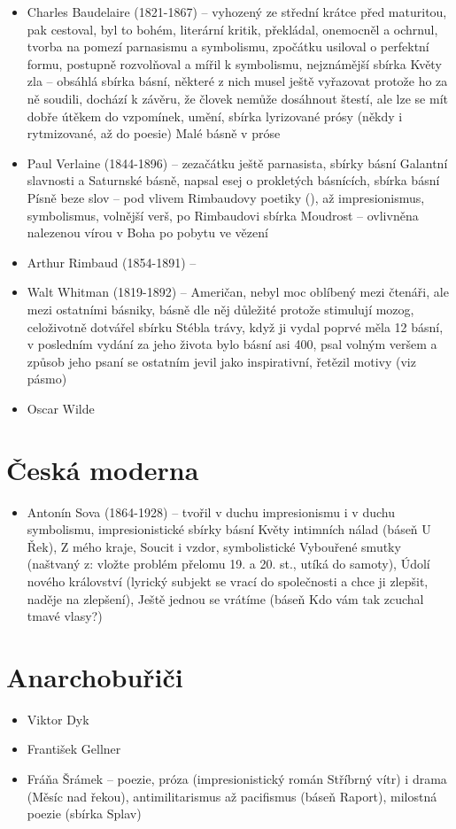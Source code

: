 \documentclass{article}
\begin{document}
\begin{itemize}
  \begin{itemize}
    \item Charles Baudelaire (1821-1867) -- vyhozený ze střední krátce před maturitou, pak cestoval, byl to bohém, literární kritik, překládal, onemocněl a ochrnul, tvorba na pomezí parnasismu a symbolismu, zpočátku usiloval o perfektní formu, postupně rozvolňoval a mířil k symbolismu, nejznámější sbírka Květy zla -- obsáhlá sbírka básní, některé z nich musel ještě vyřazovat protože ho za ně soudili, dochází k závěru, že človek nemůže dosáhnout štestí, ale lze se mít dobře útěkem do vzpomínek, umění, sbírka lyrizované prósy (někdy i rytmizované, až do poesie) Malé básně v próse
    \item Paul Verlaine (1844-1896) -- zezačátku ještě parnasista, sbírky básní Galantní slavnosti a Saturnské básně, napsal esej o prokletých básnících, sbírka básní Písně beze slov -- pod vlivem Rimbaudovy poetiky (), až impresionismus, symbolismus, volnější verš, po Rimbaudovi sbírka Moudrost -- ovlivněna nalezenou vírou v Boha po pobytu ve vězení
    \item Arthur Rimbaud (1854-1891) --
    \item Walt Whitman (1819-1892) -- Američan, nebyl moc oblíbený mezi čtenáři, ale mezi ostatními básniky, básně dle něj důležité protože stimulují mozog, celoživotně dotvářel sbírku Stébla trávy, když ji vydal poprvé měla 12 básní, v posledním vydání za jeho života bylo básní asi 400, psal volným veršem a způsob jeho psaní se ostatním jevil jako inspirativní, řetězil motivy (viz pásmo)
    \item Oscar Wilde
  \end{itemize}
\end{itemize}

\part{Česká moderna}
\begin{itemize}
  \item Antonín Sova (1864-1928) -- tvořil v duchu impresionismu i v duchu symbolismu, impresionistické sbírky básní Květy intimních nálad (báseň U Řek), Z mého kraje, Soucit i vzdor, symbolistické Vybouřené smutky (naštvaný z: vložte problém přelomu 19. a 20. st., utíká do samoty), Údolí nového království (lyrický subjekt se vrací do společnosti a chce ji zlepšit, naděje na zlepšení), Ještě jednou se vrátíme (báseň Kdo vám tak zcuchal tmavé vlasy?)
\end{itemize}

\part{Anarchobuřiči}
\begin{itemize}
  \item Viktor Dyk
  \item František Gellner
  \item Fráňa Šrámek -- poezie, próza (impresionistický román Stříbrný vítr) i drama (Měsíc nad řekou), antimilitarismus až pacifismus (báseň Raport), milostná poezie (sbírka Splav)
\end{itemize}
\end{document}

